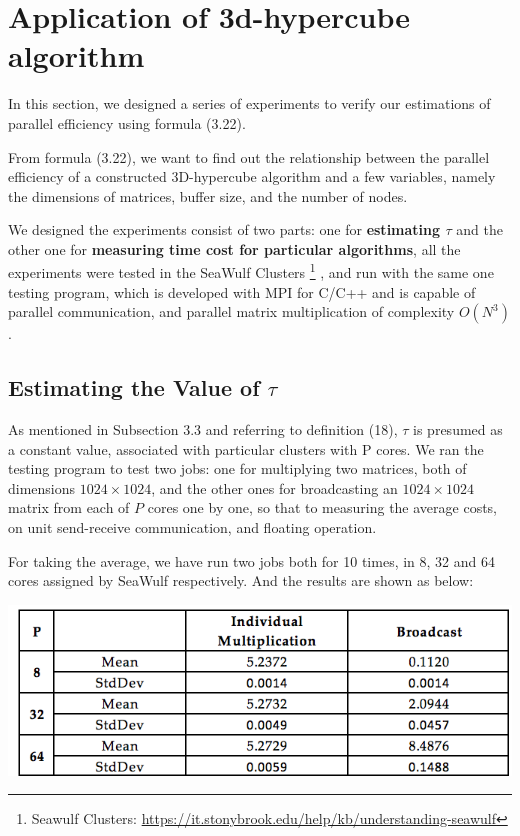 \documentclass{amsart}
\theoremstyle{definition}
\theoremstyle{remark}
\numberwithin{equation}{section}
\begin{document}
\section{Application of 3d-hypercube algorithm}
	In this section, we designed a series of experiments to verify our estimations of parallel efficiency using formula (3.22).\par
	From formula (3.22), we want to find out the relationship between the parallel efficiency of a constructed 3D-hypercube algorithm and a few variables, namely the dimensions of matrices, buffer size, and the number of nodes.\par
	We designed the experiments consist of two parts: one for \textbf{estimating $\tau$} and the other one for \textbf{measuring time cost for particular algorithms}, all the experiments were tested in the SeaWulf Clusters%
\footnote{Seawulf Clusters: \url{https://it.stonybrook.edu/help/kb/understanding-seawulf}}%
, and run with the same one testing program, which is developed with MPI for C/C++ and is capable of parallel communication, and parallel matrix multiplication of complexity $O(N^3)$.\par

\subsection{Estimating the Value of \textbf{$\tau$}}
	As mentioned in Subsection 3.3 and referring to definition (18), $\tau$ is presumed as a constant value, associated with particular clusters with P cores. We ran the testing program to test two jobs: one for multiplying two matrices, both of dimensions $1024\times 1024$, and the other ones for broadcasting an $1024\times 1024$ matrix from each of $P$ cores one by one, so that to measuring the average costs, on unit send-receive communication, and floating operation.\par
	For taking the average, we have run two jobs both for 10 times, in 8, 32 and 64 cores assigned by SeaWulf
respectively. And the results are shown as below:\par

\includegraphics[scale=1]{figures/table_1.png}
\end{document}
